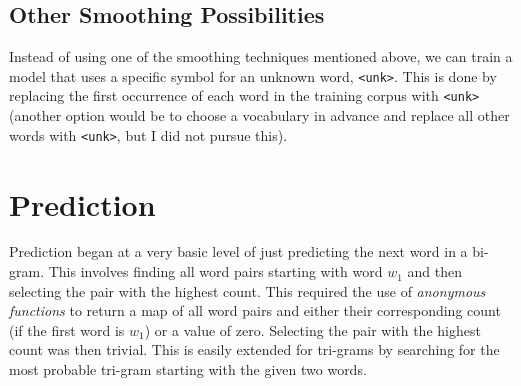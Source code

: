 \subsection{Other Smoothing Possibilities}

Instead of using one of the smoothing techniques mentioned above, we can train a model that uses a specific symbol for an unknown word, \lstinline!<unk>!. This is done by replacing the first occurrence of each word in the training corpus with \lstinline!<unk>! (another option would be to choose a vocabulary in advance and replace all other words with \lstinline!<unk>!, but I did not pursue this).


\section{Prediction}



Prediction began at a very basic level of just predicting the next word in a bi-gram. This involves finding all word pairs starting with word $w_{1}$ and then selecting the pair with the highest count. This required the use of \textit{anonymous functions} to return a map of all word pairs and either their corresponding count (if the first word is $w_{1}$) or a value of zero. Selecting the pair with the highest count was then trivial. This is easily extended for tri-grams by searching for the most probable tri-gram starting with the given two words.

%

